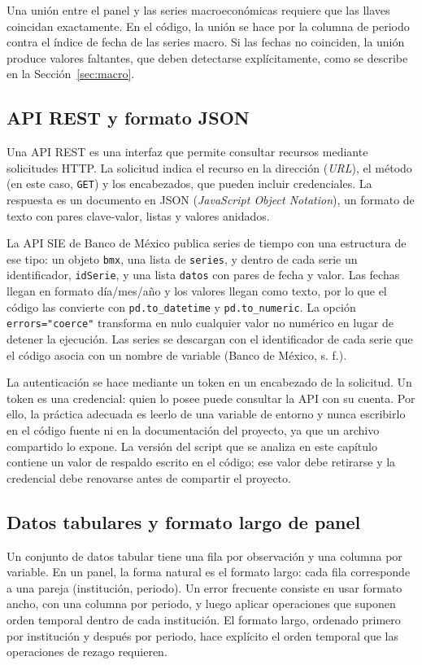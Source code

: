 Una unión entre el panel y las series macroeconómicas requiere que las llaves coincidan exactamente. En el código, la unión se hace por la columna de periodo contra el índice de fecha de las series macro. Si las fechas no coinciden, la unión produce valores faltantes, que deben detectarse explícitamente, como se describe en la Sección~\ref{sec:macro}.

\subsection{API REST y formato JSON}
Una API REST es una interfaz que permite consultar recursos mediante solicitudes HTTP. La solicitud indica el recurso en la dirección (\textit{URL}), el método (en este caso, \texttt{GET}) y los encabezados, que pueden incluir credenciales. La respuesta es un documento en JSON (\textit{JavaScript Object Notation}), un formato de texto con pares clave-valor, listas y valores anidados.

La API SIE de Banco de México publica series de tiempo con una estructura de ese tipo: un objeto \texttt{bmx}, una lista de \texttt{series}, y dentro de cada serie un identificador, \texttt{idSerie}, y una lista \texttt{datos} con pares de fecha y valor. Las fechas llegan en formato día/mes/año y los valores llegan como texto, por lo que el código las convierte con \texttt{pd.to\_datetime} y \texttt{pd.to\_numeric}. La opción \texttt{errors="coerce"} transforma en nulo cualquier valor no numérico en lugar de detener la ejecución. Las series se descargan con el identificador de cada serie que el código asocia con un nombre de variable (Banco de México, s. f.).

La autenticación se hace mediante un token en un encabezado de la solicitud. Un token es una credencial: quien lo posee puede consultar la API con su cuenta. Por ello, la práctica adecuada es leerlo de una variable de entorno y nunca escribirlo en el código fuente ni en la documentación del proyecto, ya que un archivo compartido lo expone. La versión del script que se analiza en este capítulo contiene un valor de respaldo escrito en el código; ese valor debe retirarse y la credencial debe renovarse antes de compartir el proyecto.

\subsection{Datos tabulares y formato largo de panel}
Un conjunto de datos tabular tiene una fila por observación y una columna por variable. En un panel, la forma natural es el formato largo: cada fila corresponde a una pareja (institución, periodo). Un error frecuente consiste en usar formato ancho, con una columna por periodo, y luego aplicar operaciones que suponen orden temporal dentro de cada institución. El formato largo, ordenado primero por institución y después por periodo, hace explícito el orden temporal que las operaciones de rezago requieren.

